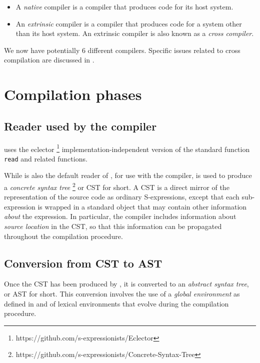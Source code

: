 \begin{itemize}
\item A \emph{native} compiler is a compiler that produces code for
  its host \commonlisp{} system. 
\item An \emph{extrinsic} compiler is a compiler that produces code
  for a \commonlisp{} system other than its host system.  An extrinsic
  compiler is also known as a \emph{cross compiler}.
\end{itemize}

We now have potentially 6 different compilers.  Specific issues
related to cross compilation are discussed in
. 

\section{Compilation phases}

\subsection{Reader used by the compiler}

\sysname{} uses the eclector{}%
\footnote{https://github.com/s-expressionists/Eclector}
implementation-independent version of the standard function
\texttt{read} and related functions.

While \eclector{} is also the default reader of \sysname{}, for use
with the compiler, \eclector{} is used to produce a \emph{concrete
  syntax tree}%
\footnote{https://github.com/s-expressionists/Concrete-Syntax-Tree} or
CST for short.  A CST is a direct mirror of the representation of the
source code as ordinary S-expressions, except that each sub-expression
is wrapped in a standard object that may contain other information
\emph{about} the expression.  In particular, the \sysname{} compiler
includes information about \emph{source location} in the CST, so that
this information can be propagated throughout the compilation
procedure.

\subsection{Conversion from CST to AST}

Once the CST has been produced by \eclector{}, it is converted to an
\emph{abstract syntax tree}, or AST for short.  This conversion
involves the use of a \emph{global environment} as defined in
 and of lexical environments that
evolve during the compilation procedure.

